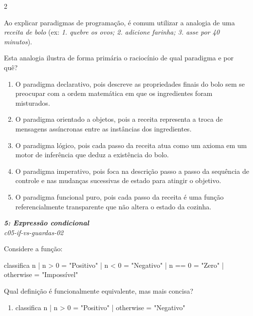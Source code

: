 \documentclass[a4paper,10pt,brazil]{article}
\begin{document}
\begin{multicols}{2}
\begin{flushright}
\end{flushright}
Ao explicar paradigmas de programação, é comum utilizar a analogia de uma \emph{receita de bolo} (ex: \emph{1. quebre os ovos; 2. adicione farinha; 3. asse por 40 minutos}). 

Esta analogia ilustra de forma primária o raciocínio de qual paradigma e por quê?

\begin{enumerate}
  \item O paradigma declarativo, pois descreve as propriedades finais do bolo sem se preocupar com a ordem matemática em que os ingredientes foram misturados.

  \item O paradigma orientado a objetos, pois a receita representa a troca de mensagens assíncronas entre as instâncias dos ingredientes.

  \item O paradigma lógico, pois cada passo da receita atua como um axioma em um motor de inferência que deduz a existência do bolo.

  \item O paradigma imperativo, pois foca na descrição passo a passo da sequência de controle e nas mudanças sucessivas de estado para atingir o objetivo.

  \item O paradigma funcional puro, pois cada passo da receita é uma função referencialmente transparente que não altera o estado da cozinha.


\end{enumerate}

\begin{flushright}
  \footnotesize
  \textit{\textbf{5: Expressão condicional}}\\
  \textit{c05-if-vs-guardas-02}\\

\end{flushright}
Considere a função:
\begin{haskellcode}
classifica n
  | n > 0     = "Positivo"
  | n < 0     = "Negativo"
  | n == 0    = "Zero"
  | otherwise = "Impossível"
\end{haskellcode}
Qual definição é funcionalmente equivalente, mas mais concisa?

\begin{enumerate}
  \item \begin{haskellcode}
classifica n
  | n > 0     = "Positivo"
  | otherwise = "Negativo"
\end{haskellcode}


\end{enumerate}
\end{multicols}
\end{document}
